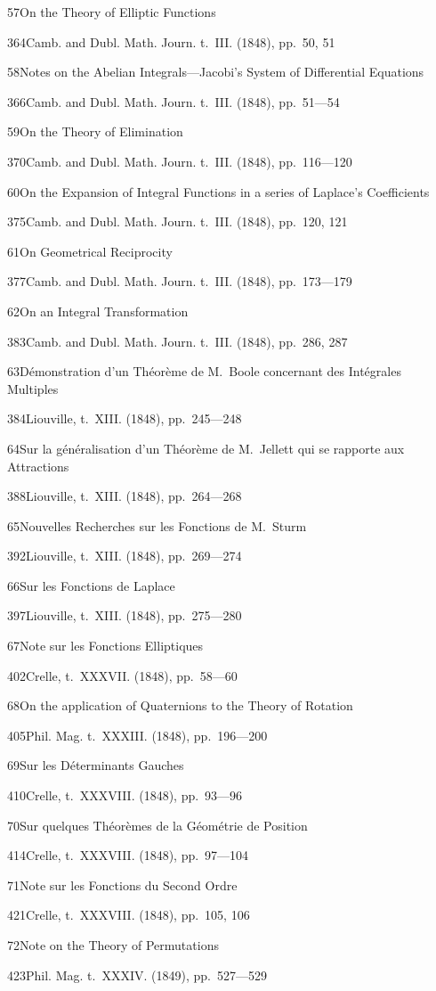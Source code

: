 \documentclass[11pt,a4paper]{book}
\providecommand{\tocentry}[2]{#1\dotfill #2\par}
\begin{document}
\tocentry{57}{On the Theory of Elliptic Functions}{364}{Camb. and Dubl. Math. Journ. t.~III. (1848), pp.~50, 51}

\tocentry{58}{Notes on the Abelian Integrals---Jacobi's System of Differential Equations}{366}{Camb. and Dubl. Math. Journ. t.~III. (1848), pp.~51---54}

\tocentry{59}{On the Theory of Elimination}{370}{Camb. and Dubl. Math. Journ. t.~III. (1848), pp.~116---120}

\tocentry{60}{On the Expansion of Integral Functions in a series of Laplace's Coefficients}{375}{Camb. and Dubl. Math. Journ. t.~III. (1848), pp.~120, 121}

\tocentry{61}{On Geometrical Reciprocity}{377}{Camb. and Dubl. Math. Journ. t.~III. (1848), pp.~173---179}

\tocentry{62}{On an Integral Transformation}{383}{Camb. and Dubl. Math. Journ. t.~III. (1848), pp.~286, 287}

\tocentry{63}{D\'{e}monstration d'un Th\'{e}or\`{e}me de M.~Boole concernant des Int\'{e}grales Multiples}{384}{Liouville, t.~XIII. (1848), pp.~245---248}

\newpage

\tocentry{64}{Sur la g\'{e}n\'{e}ralisation d'un Th\'{e}or\`{e}me de M.~Jellett qui se rapporte aux Attractions}{388}{Liouville, t.~XIII. (1848), pp.~264---268}

\tocentry{65}{Nouvelles Recherches sur les Fonctions de M.~Sturm}{392}{Liouville, t.~XIII. (1848), pp.~269---274}

\tocentry{66}{Sur les Fonctions de Laplace}{397}{Liouville, t.~XIII. (1848), pp.~275---280}

\tocentry{67}{Note sur les Fonctions Elliptiques}{402}{Crelle, t.~XXXVII. (1848), pp.~58---60}

\tocentry{68}{On the application of Quaternions to the Theory of Rotation}{405}{Phil. Mag. t.~XXXIII. (1848), pp.~196---200}

\tocentry{69}{Sur les D\'{e}terminants Gauches}{410}{Crelle, t.~XXXVIII. (1848), pp.~93---96}

\tocentry{70}{Sur quelques Th\'{e}or\`{e}mes de la G\'{e}om\'{e}trie de Position}{414}{Crelle, t.~XXXVIII. (1848), pp.~97---104}

\tocentry{71}{Note sur les Fonctions du Second Ordre}{421}{Crelle, t.~XXXVIII. (1848), pp.~105, 106}

\tocentry{72}{Note on the Theory of Permutations}{423}{Phil. Mag. t.~XXXIV. (1849), pp.~527---529}
\end{document}
